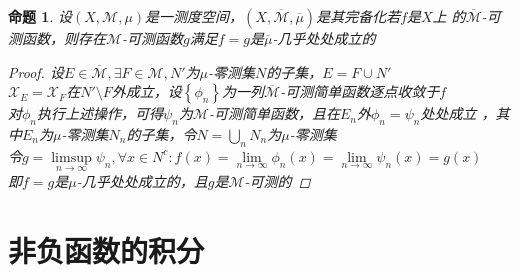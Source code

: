 \documentclass[12pt, a4paper, oneside]{ctexbook}
\newtheorem{proposition}[theorem]{命题}
\begin{document}
\begin{proposition}
    设$(X,\mathcal{M},\mu)$是一测度空间，$(X,\overline{\mathcal{M}},\overline{\mu})$是其完备化若$f$是$X$上
    的$\overline{\mathcal{M}}$-可测函数，则存在$\mathcal{M}$-可测函数$g$满足$f=g$是$\overline{\mu}$-几乎处处成立的
    \begin{proof}
        设$E\in\overline{\mathcal{M}},\exists F\in\mathcal{M},N'$为$\mu$-零测集$N$的子集，$E=F\cup N'$\\
        $\mathcal{X}_E=\mathcal{X}_F$在$N'\setminus F$外成立，设$\left\{\phi_n\right\}$为一列$\overline{\mathcal{M}}$-可测简单函数逐点收敛于$f$\\
        对$\phi_n$执行上述操作，可得$\psi_n$为$\mathcal{M}$-可测简单函数，且在$E_n$外$\phi_n=\psi_n$处处成立
        ，其中$E_n$为$\mu$-零测集$N_n$的子集，令$N=\bigcup_n N_n$为$\mu$-零测集\\
        令$g=\underset{n\to \infty}{\limsup}\psi_n,\forall x\in N^c:f(x)=\underset{n\to\infty}{\lim}\phi_n(x)=\underset{n\to\infty}{\lim}\psi_n(x)=g(x)$\\
        即$f=g$是$\mu$-几乎处处成立的，且$g$是$\mathcal{M}$-可测的
    \end{proof}
\end{proposition}

\section{非负函数的积分}
\end{document}
